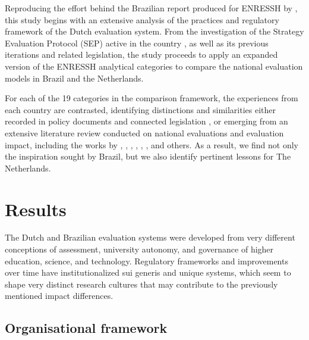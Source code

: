 Reproducing the effort behind the Brazilian report produced for ENRESSH by \textcite{Brasil.2022e}, this study begins with an extensive analysis of the practices and regulatory framework of the Dutch evaluation system. From the investigation of the Strategy Evaluation Protocol (SEP) active in the country \autocite{VSNU.2020}, as well as its previous iterations and related legislation, the study proceeds to apply an expanded version of the ENRESSH analytical categories to compare the national evaluation models in Brazil and the Netherlands. 

For each of the 19 categories in the comparison framework, the experiences from each country are contrasted, identifying distinctions and similarities either recorded in policy documents and connected legislation \autocite[e.g.,][]{OCW.1992, VSNU.2003, VSNU.2009, VSNU.2016}, or emerging from an extensive literature review conducted on national evaluations and evaluation impact, including the works by \textcite{Capano.2010}, \textcite{Hammarfelt.2015}, \textcite{Leeuw.2008}, \citeauthor{Molas-Gallart.2012} \autocite*{Molas-Gallart.2012, Molas-Gallart.2014}, \textcite{Ochsner.2021}, \textcite{Verhine.2012}, and others. As a result, we find not only the inspiration sought by Brazil, but we also identify pertinent lessons for The Netherlands.

\section{Results}
\label{sec:comp_evaluation:results}

The Dutch and Brazilian evaluation systems were developed from very different conceptions of assessment, university autonomy, and governance of higher education, science, and technology. Regulatory frameworks and improvements over time have institutionalized sui generis and unique systems, which seem to shape very distinct research cultures that may contribute to the previously mentioned impact differences.

\subsection{Organisational framework}
\label{subsec:comp_evaluation:organisation}





